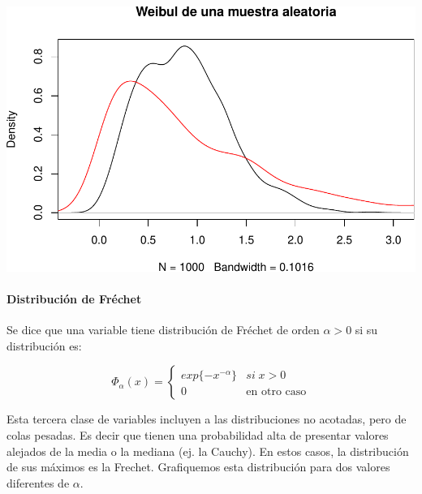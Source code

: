\documentclass[
  oneside]{article}
\begin{document}
\includegraphics{main_files/figure-latex/unnamed-chunk-39-1.pdf}

\hypertarget{distribuciuxf3n-de-fruxe9chet}{%
\paragraph{Distribución de
Fréchet}\label{distribuciuxf3n-de-fruxe9chet}}

Se dice que una variable tiene distribución de Fréchet de orden
\(\alpha>0\) si su distribución es:

\begin{equation}
\Phi_{\alpha}(x)=\begin{cases}
exp\{-x^{-\alpha}\} & si\;x>0\\
0 & \text{en otro caso}
\end{cases}
\end{equation}

Esta tercera clase de variables incluyen a las distribuciones no
acotadas, pero de colas pesadas. Es decir que tienen una probabilidad
alta de presentar valores alejados de la media o la mediana (ej. la
Cauchy). En estos casos, la distribución de sus máximos es la Frechet.
Grafiquemos esta distribución para dos valores diferentes de \(\alpha\).
\end{document}
